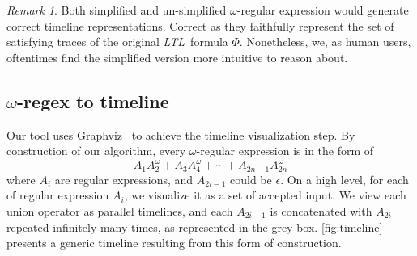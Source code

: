 \documentclass[preprint,12pt]{elsarticle}
\theoremstyle{definition}
\theoremstyle{remark}
\newtheorem{remark}{Remark}[section]
\newcommand{\ltl}{\textit{LTL}}
\begin{document}
\begin{remark}
    Both simplified and un-simplified $\omega$-regular expression would generate correct timeline representations. Correct as they faithfully represent the set of satisfying traces of the original \ltl\ formula $\Phi$. Nonetheless, we, as human users, oftentimes find the simplified version more intuitive to reason about.
\end{remark}

\subsection{$\omega$-regex to timeline} \label{regex2timeline}
Our tool uses Graphviz~\cite{Ellson2001GraphvizO} to achieve the timeline visualization step. By construction of our algorithm, every $\omega$-regular expression is in the form of
\[
    A_1A_2^{\omega} + A_3A_4^{\omega} + \cdots + A_{2n-1}A_{2n}^{\omega}
\]
where $A_i$ are regular expressions, and $A_{2i-1}$ could be $\epsilon$. On a high level, for each of regular expression $A_i$, we visualize it as a set of accepted input. We view each union operator as parallel timelines, and each $A_{2i-1}$ is concatenated with $A_{2i}$ repeated infinitely many times, as represented in the grey box. \cref{fig:timeline} presents a generic timeline resulting from this form of construction.
\end{document}
